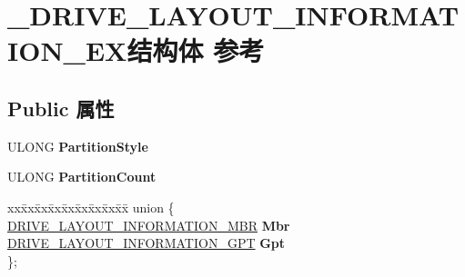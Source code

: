 \hypertarget{struct___d_r_i_v_e___l_a_y_o_u_t___i_n_f_o_r_m_a_t_i_o_n___e_x}{}\section{\+\_\+\+D\+R\+I\+V\+E\+\_\+\+L\+A\+Y\+O\+U\+T\+\_\+\+I\+N\+F\+O\+R\+M\+A\+T\+I\+O\+N\+\_\+\+E\+X结构体 参考}
\label{struct___d_r_i_v_e___l_a_y_o_u_t___i_n_f_o_r_m_a_t_i_o_n___e_x}
\subsection*{Public 属性}
\begin{DoxyCompactItemize}
\item 
\mbox{\label{struct___d_r_i_v_e___l_a_y_o_u_t___i_n_f_o_r_m_a_t_i_o_n___e_x_a683803f61cadee863c74af2c506efcf0}} 
U\+L\+O\+NG {\bfseries Partition\+Style}
\item 
\mbox{\label{struct___d_r_i_v_e___l_a_y_o_u_t___i_n_f_o_r_m_a_t_i_o_n___e_x_af9d11e02c9caaf1479b759231bcc2a43}} 
U\+L\+O\+NG {\bfseries Partition\+Count}
\item 
\mbox{\label{struct___d_r_i_v_e___l_a_y_o_u_t___i_n_f_o_r_m_a_t_i_o_n___e_x_ad4c2e84f20be412404a4b6f856f61c0c}} 
\begin{tabbing}
xx\=xx\=xx\=xx\=xx\=xx\=xx\=xx\=xx\=\kill
union \{\\
\>\hyperlink{struct___d_r_i_v_e___l_a_y_o_u_t___i_n_f_o_r_m_a_t_i_o_n___m_b_r}{DRIVE\_LAYOUT\_INFORMATION\_MBR} {\bfseries Mbr}\\
\>\hyperlink{struct___d_r_i_v_e___l_a_y_o_u_t___i_n_f_o_r_m_a_t_i_o_n___g_p_t}{DRIVE\_LAYOUT\_INFORMATION\_GPT} {\bfseries Gpt}\\
\}; \\


\end{tabbing}
\end{DoxyCompactItemize}
